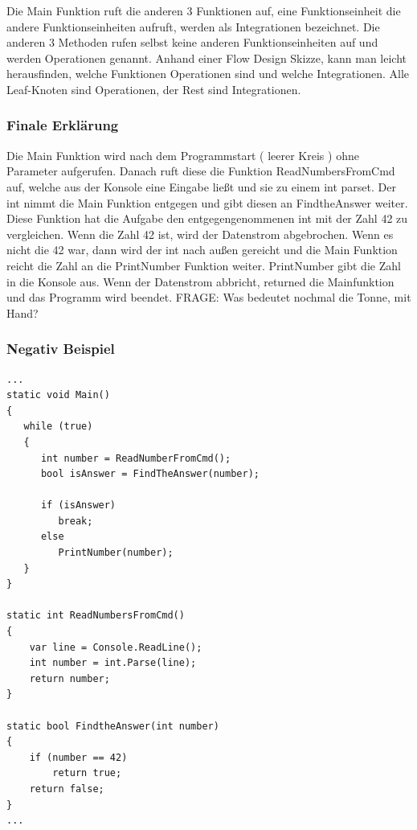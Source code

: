 \documentclass[11pt]{article}
\begin{document}
Die Main Funktion ruft die anderen 3 Funktionen auf, eine Funktionseinheit die andere Funktionseinheiten aufruft,
werden als Integrationen bezeichnet. Die anderen 3 Methoden rufen selbst keine anderen Funktionseinheiten auf und werden
Operationen genannt. Anhand einer Flow Design Skizze, kann man leicht herausfinden, welche Funktionen Operationen sind und welche
Integrationen.
Alle Leaf-Knoten sind Operationen, der Rest sind Integrationen.
\subsubsection{Finale Erklärung}
\label{sec:orgheadline52}
Die Main Funktion wird nach dem Programmstart ( leerer Kreis ) ohne Parameter aufgerufen.
Danach ruft diese die Funktion ReadNumbersFromCmd auf, welche aus der Konsole eine Eingabe ließt und sie
zu einem int parset. Der int nimmt die Main Funktion entgegen und gibt diesen an FindtheAnswer weiter.
Diese Funktion hat die Aufgabe den entgegengenommenen int mit der Zahl 42 zu vergleichen. Wenn die Zahl 42 ist, wird der Datenstrom
abgebrochen. Wenn es nicht die 42 war, dann wird der int nach außen gereicht und die Main Funktion reicht die Zahl an die
PrintNumber Funktion weiter. PrintNumber gibt die Zahl in die Konsole aus.
Wenn der Datenstrom abbricht, returned die Mainfunktion und das Programm wird beendet.
FRAGE: Was bedeutet nochmal die Tonne, mit Hand?


\subsubsection{Negativ Beispiel}
\label{sec:orgheadline53}
\begin{verbatim}
...
static void Main()
{
   while (true)
   {
      int number = ReadNumberFromCmd();
      bool isAnswer = FindTheAnswer(number);

      if (isAnswer)
         break;
      else
         PrintNumber(number);
   }
}

static int ReadNumbersFromCmd()
{
    var line = Console.ReadLine();
    int number = int.Parse(line);
    return number;
}

static bool FindtheAnswer(int number)
{ 
    if (number == 42)
        return true;
    return false;
}
...
\end{verbatim}
\end{document}
